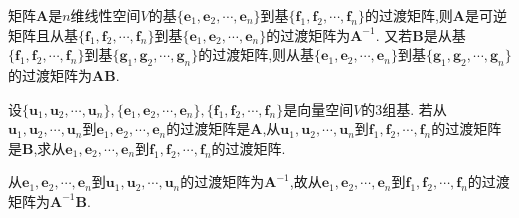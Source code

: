 \documentclass[../../main.tex]{subfiles}
\begin{document}
\begin{theorem}\label{theorem:两次基变换后的过渡矩阵}
矩阵\(\boldsymbol{A}\)是\(n\)维线性空间\(V\)的基\(\{\boldsymbol{e}_1,\boldsymbol{e}_2,\cdots,\boldsymbol{e}_n\}\)到基\(\{\boldsymbol{f}_1,\boldsymbol{f}_2,\cdots,\boldsymbol{f}_n\}\)的过渡矩阵,则\(\boldsymbol{A}\)是可逆矩阵且从基\(\{\boldsymbol{f}_1,\boldsymbol{f}_2,\cdots,\boldsymbol{f}_n\}\)到基\(\{\boldsymbol{e}_1,\boldsymbol{e}_2,\cdots,\boldsymbol{e}_n\}\)的过渡矩阵为\(\boldsymbol{A}^{-1}\). 又若\(\boldsymbol{B}\)是从基\(\{\boldsymbol{f}_1,\boldsymbol{f}_2,\cdots,\boldsymbol{f}_n\}\)到基\(\{\boldsymbol{g}_1,\boldsymbol{g}_2,\cdots,\boldsymbol{g}_n\}\)的过渡矩阵,则从基\(\{\boldsymbol{e}_1,\boldsymbol{e}_2,\cdots,\boldsymbol{e}_n\}\)到基\(\{\boldsymbol{g}_1,\boldsymbol{g}_2,\cdots,\boldsymbol{g}_n\}\)的过渡矩阵为\(\boldsymbol{A}\boldsymbol{B}\).
\end{theorem}

\begin{example}
设\(\{\boldsymbol{u}_1,\boldsymbol{u}_2,\cdots,\boldsymbol{u}_n\},\{\boldsymbol{e}_1,\boldsymbol{e}_2,\cdots,\boldsymbol{e}_n\},\{\boldsymbol{f}_1,\boldsymbol{f}_2,\cdots,\boldsymbol{f}_n\}\)是向量空间\(V\)的3组基. 若从\(\boldsymbol{u}_1,\boldsymbol{u}_2,\cdots,\boldsymbol{u}_n\)到\(\boldsymbol{e}_1,\boldsymbol{e}_2,\cdots,\boldsymbol{e}_n\)的过渡矩阵是\(\boldsymbol{A}\),从\(\boldsymbol{u}_1,\boldsymbol{u}_2,\cdots,\boldsymbol{u}_n\)到\(\boldsymbol{f}_1,\boldsymbol{f}_2,\cdots,\boldsymbol{f}_n\)的过渡矩阵是\(\boldsymbol{B}\),求从\(\boldsymbol{e}_1,\boldsymbol{e}_2,\cdots,\boldsymbol{e}_n\)到\(\boldsymbol{f}_1,\boldsymbol{f}_2,\cdots,\boldsymbol{f}_n\)的过渡矩阵.
\end{example}
\begin{solution}
从\(\boldsymbol{e}_1,\boldsymbol{e}_2,\cdots,\boldsymbol{e}_n\)到\(\boldsymbol{u}_1,\boldsymbol{u}_2,\cdots,\boldsymbol{u}_n\)的过渡矩阵为\(\boldsymbol{A}^{-1}\),故从\(\boldsymbol{e}_1,\boldsymbol{e}_2,\cdots,\boldsymbol{e}_n\)到\(\boldsymbol{f}_1,\boldsymbol{f}_2,\cdots,\boldsymbol{f}_n\)的过渡矩阵为\(\boldsymbol{A}^{-1}\boldsymbol{B}\).
\end{solution}
\end{document}
